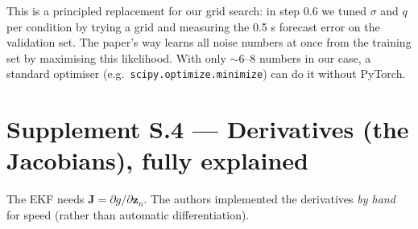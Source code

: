 \documentclass[11pt,a4paper]{article}
\newcommand{\zz}{\mathbf{z}}
\begin{document}
\begin{ours}
This is a principled replacement for our grid search: in step 0.6 we tuned $\sigma$ and $q$ per condition by trying a grid and measuring the 0.5 s forecast error on the validation set.
The paper's way learns all noise numbers at once from the training set by maximising this likelihood. With only $\sim$6--8 numbers in our case, a standard optimiser (e.g.\ \texttt{scipy.optimize.minimize}) can do it without PyTorch.
\end{ours}

\section{Supplement S.4 --- Derivatives (the Jacobians), fully explained}\label{sec:jac}
The EKF needs $\mathbf J=\partial g/\partial\zz_n$. The authors implemented the derivatives \emph{by hand} for speed (rather than automatic differentiation).
\end{document}
